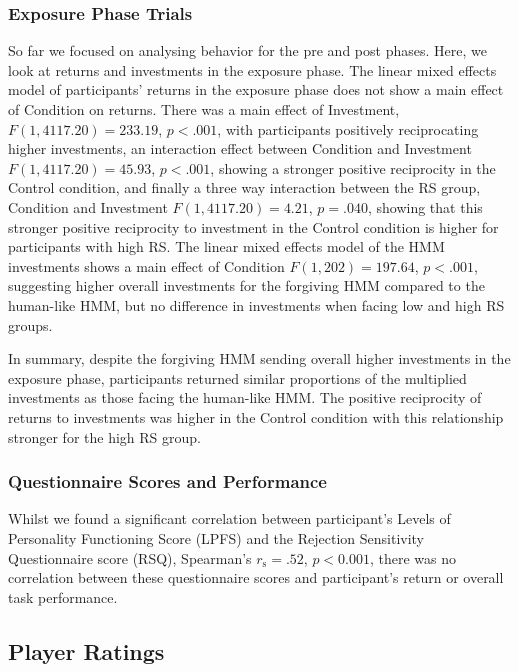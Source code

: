 \documentclass[
]{article}
\begin{document}
\subsubsection{Exposure Phase Trials}\label{exposure-phase-trials}

So far we focused on analysing behavior for the pre and post phases.
Here, we look at returns and investments in the exposure phase. The
linear mixed effects model of participants' returns in the exposure
phase does not show a main effect of Condition on returns. There was a
main effect of Investment,
\(F(1, 4117.20) = 233.19\), \(p < .001\), with
participants positively reciprocating higher investments, an interaction
effect between Condition and Investment
\(F(1, 4117.20) = 45.93\), \(p < .001\),
showing a stronger positive reciprocity in the Control condition, and
finally a three way interaction between the RS group, Condition and
Investment
\(F(1, 4117.20) = 4.21\), \(p = .040\),
showing that this stronger positive reciprocity to investment in the
Control condition is higher for participants with high RS. The linear
mixed effects model of the HMM investments shows a main effect of
Condition \(F(1, 202) = 197.64\), \(p < .001\),
suggesting higher overall investments for the forgiving HMM compared to
the human-like HMM, but no difference in investments when facing low and
high RS groups.

In summary, despite the forgiving HMM sending overall higher investments
in the exposure phase, participants returned similar proportions of the
multiplied investments as those facing the human-like HMM. The positive
reciprocity of returns to investments was higher in the Control
condition with this relationship stronger for the high RS group.

\subsubsection{Questionnaire Scores and Performance}\label{questionnaire-scores-and-performance}

Whilst we found a significant correlation between participant's Levels
of Personality Functioning Score (LPFS) and the Rejection Sensitivity
Questionnaire score (RSQ), Spearman's \(r_{\mathrm{s}} = .52\), \(p < 0.001\),
there was no correlation between these questionnaire scores and
participant's return or overall task performance.

\subsection{Player Ratings}\label{player-ratings}
\end{document}

